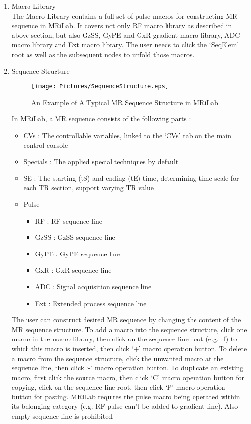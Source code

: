 \documentclass{book}%
\begin{document}
\begin{enumerate}
	\item Macro Library \\
	
	The Macro Library contains a full set of pulse macros for constructing MR sequence in MRiLab. It covers not only RF macro library as described in above section, but also GzSS, GyPE and GxR gradient macro library, ADC macro library and Ext macro library. The user needs to click the `SeqElem' root as well as the subsequent nodes to unfold those macros.
	
	\item Sequence Structure \\
	
\begin{figure}[htbp]
	\centering
		\texttt{[image: Pictures/SequenceStructure.eps]}
	\caption{An Example of A Typical MR Sequence Structure in MRiLab}
	\label{fig:SequenceStructure}
\end{figure}
	
	
In MRiLab, a MR sequence consists of the following parts :

\begin{itemize}
	\item CVs : The controllable variables, linked to the `CVs' tab on the main control console
	\item Specials : The applied special techniques by default
	\item SE : The starting (tS) and ending (tE) time, determining time scale for each TR section, support varying TR value
	\item Pulse
	\begin{itemize}
		\item RF : RF sequence line
		\item GzSS : GzSS sequence line
		\item GyPE : GyPE sequence line
		\item GxR : GxR sequence line
		\item ADC : Signal acquisition sequence line
		\item Ext : Extended process sequence line
	\end{itemize}
\end{itemize}

The user can construct desired MR sequence by changing the content of the MR sequence structure. To add a macro into the sequence structure, click one macro in the macro library, then click on the sequence line root (e.g. rf) to which this macro is inserted, then click `+' macro operation button. To delete a macro from the sequence structure, click the unwanted macro at the sequence line, then click `-' macro operation button. To duplicate an existing macro, first click the source macro, then click `C' macro operation button for copying, click on the sequence line root, then click `P' macro operation button for pasting. MRiLab requires the pulse macro being operated within its belonging category (e.g. RF pulse can't be added to gradient line). Also empty sequence line is prohibited.


\end{enumerate}
\end{document}
